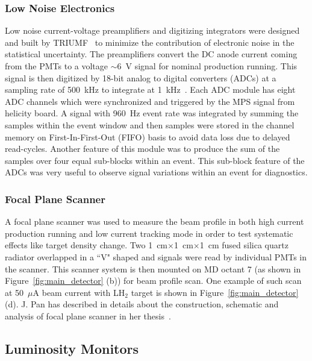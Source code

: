 \subsubsection{Low Noise Electronics}%
\label{Low Noise Electronics}

Low noise current-voltage preamplifiers and digitizing integrators were designed and built by TRIUMF~\cite{website:TRIUMF} to minimize the contribution of electronic noise in the statistical uncertainty. The preamplifiers convert the DC anode current coming from the PMTs to a voltage $\sim$6~V signal for nominal production running. This signal is then digitized by 18-bit analog to digital converters (ADCs) at a sampling rate of 500~kHz to integrate at 1~kHz~\cite{manual_TRIUMF_ADC}. Each ADC module has eight ADC channels which were synchronized and triggered by the MPS signal from helicity board. A signal with 960~Hz event rate was integrated by summing the samples within the event window and then samples were stored in the channel memory on First-In-First-Out (FIFO) basis to avoid data loss due to delayed read-cycles. Another feature of this module was to produce the sum of the samples over four equal sub-blocks within an event. This sub-block feature of the ADCs was very useful to observe signal variations within an event for diagnostics. 


\subsubsection{Focal Plane Scanner}%
\label{Focal Plane Scanner}

A focal plane scanner was used to measure the beam profile in both high current production running and low current tracking mode in order to test systematic effects like target density change. Two 1~cm$\times$1~cm$\times$1~cm fused silica quartz radiator overlapped in a ``V" shaped and signals were read by individual PMTs in the scanner. This scanner system is then mounted on MD octant 7 (as shown in Figure~\ref{fig:main_detector} (b)) for beam profile scan. One example of such scan at 50~$\mu$A beam current with LH$_{2}$ target is shown in Figure~\ref{fig:main_detector} (d). J. Pan has described in details about the construction, schematic and analysis of focal plane scanner in her thesis~\cite{jie_qweak_thesis}.


\subsection{Luminosity Monitors}%
\label{Luminosity Monitors}



